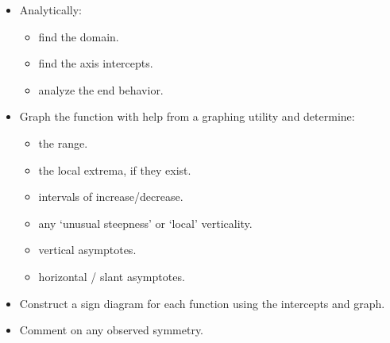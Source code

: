\begin{itemize}

\item Analytically:

\begin{multicols}{3}

\begin{itemize}

\item find the domain.

\item find the axis intercepts.

\item analyze the end behavior.

\end{itemize}

\end{multicols}

\item Graph the function with help from a graphing utility and determine:

\begin{multicols}{2}

\begin{itemize}

\item  the range.

\item the local extrema, if they exist.

\end{itemize}

\end{multicols}

\begin{multicols}{2}

\begin{itemize}

\item intervals of increase/decrease.

\item any `unusual steepness' or `local' verticality.

\end{itemize}

\end{multicols}

\begin{multicols}{2}

\begin{itemize}

\item  vertical asymptotes.

\item  horizontal / slant asymptotes.

\end{itemize}

\end{multicols}

\item Construct a sign diagram for each function using the intercepts and graph.

\item  Comment on any observed symmetry.


\end{itemize}


